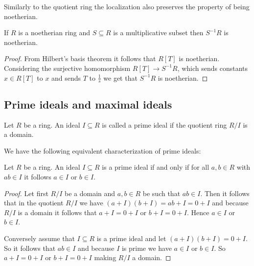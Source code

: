 \documentclass[../notes.tex]{subfiles}
\begin{document}
\smallskip
\noindent
Similarly to the quotient ring the localization also preserves the property of being
noetherian.

\begin{lemm}{}{}
  If $R$ is a noetherian ring and $S \subseteq R$ is a multiplicative subset then
  $S^{-1}R$ is noetherian.
\end{lemm}

\begin{proof}
  From Hilbert's basis theorem it follows that $R[T]$ is noetherian. Considering the surjective
  homomorphism $R[T] \to S^{-1}R$, which sends constants $x \in R[T]$ to $x$ and sends
  $T$ to $\frac{1}{s}$ we get that $S^{-1}R$ is noetherian.
\end{proof}

\subsection{Prime ideals and maximal ideals}

\begin{defi}{}{}
  Let $R$ be a ring. An ideal $I  \subseteq R$ is called a prime ideal if the quotient ring
  $R/I$ is a domain.
\end{defi}

\smallskip
\noindent
We have the following equivalent characterization of prime ideals:

\smallskip

\begin{lemm}{}{}
  Let $R$ be a ring. An ideal $I \subseteq R$ is a prime ideal if and only if for all
  $a,b \in R$ with $ab \in I$ it follows $a \in I$ or $b \in I$.
\end{lemm}

\begin{proof}
  Let first $R/I$ be a domain and $a,b \in R$ be such that $ab \in I$.
  Then it follows that in the quotient $R/I$ we have $(a+I)(b+I) = ab + I = 0 + I$ and
  because $R/I$ is a domain it follows that $a + I = 0 + I$ or $b + I = 0 + I$.
  Hence $a \in I$ or $b \in I$.

  \smallskip
  \noindent
  Conversely assume that $I \subseteq R$ is a prime ideal and let
  $(a + I)(b + I) = 0 + I$. So it follows that $ab \in I$ and because $I$ is prime
  we have $a \in I$ or $b \in I$. So $a + I = 0 + I$ or $b + I = 0 + I$ making
  $R/I$ a domain.
  
\end{proof}

\smallskip
\end{document}
